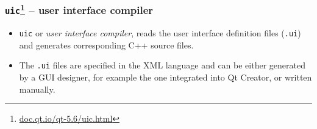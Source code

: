 \begin{frame}
  \frametitle{\texttt{uic}\footnote
    {\url{doc.qt.io/qt-5.6/uic.html}} -- user interface compiler}
  \begin{itemize}
    \item \texttt{uic} or {\em user interface compiler}, reads the user interface
      definition files (\texttt{.ui}) and generates corresponding C++ source files.
    \item The \texttt{.ui} files are specified in the XML language and can be
      either generated by a GUI designer, for example the one integrated into
      Qt Creator, or written manually.

  \end{itemize}
\end{frame}


